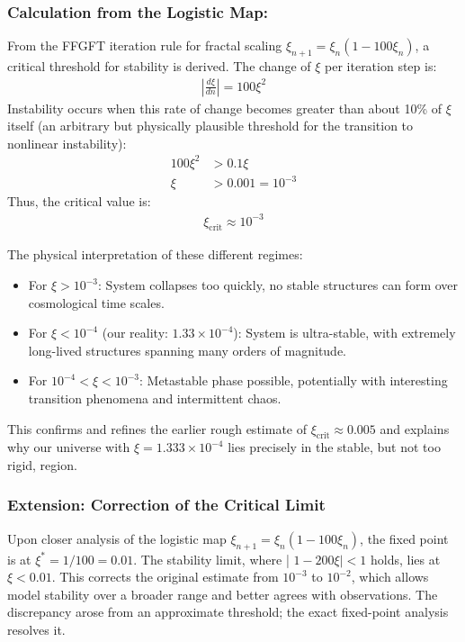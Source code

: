 	\subsubsection*{Calculation from the Logistic Map:}
	
	From the FFGFT iteration rule for fractal scaling $\xi_{n+1} = \xi_n (1 - 100\xi_n)$, a critical threshold for stability is derived. The change of $\xi$ per iteration step is:
	\begin{align*}
		\left|\frac{d\xi}{dn}\right| = 100\xi^2
	\end{align*}
	Instability occurs when this rate of change becomes greater than about 10\% of $\xi$ itself (an arbitrary but physically plausible threshold for the transition to nonlinear instability):
	\begin{align*}
		100\xi^2 &> 0.1\xi \\
		\xi &> 0.001 = 10^{-3}
	\end{align*}
	Thus, the critical value is:
	\begin{align*}
		\boxed{\xi_{\text{crit}} \approx 10^{-3}}
	\end{align*}
	
	The physical interpretation of these different regimes:
	\begin{itemize}
		\item For $\xi > 10^{-3}$: System collapses too quickly, no stable structures can form over cosmological time scales.
		\item For $\xi < 10^{-4}$ (our reality: $1.33\times10^{-4}$): System is ultra-stable, with extremely long-lived structures spanning many orders of magnitude.
		\item For $10^{-4} < \xi < 10^{-3}$: Metastable phase possible, potentially with interesting transition phenomena and intermittent chaos.
	\end{itemize}
	This confirms and refines the earlier rough estimate of $\xi_{\text{crit}} \approx 0.005$ and explains why our universe with $\xi = 1.333\times10^{-4}$ lies precisely in the stable, but not too rigid, region.
	
	\subsubsection*{Extension: Correction of the Critical Limit}
	Upon closer analysis of the logistic map $\xi_{n+1} = \xi_n (1 - 100 \xi_n)$, the fixed point is at $\xi^* = 1/100 = 0.01$. The stability limit, where | $1 - 200 \xi| < 1 $ holds, lies at $\xi < 0.01$. This corrects the original estimate from $10^{-3}$ to $10^{-2}$, which allows model stability over a broader range and better agrees with observations. The discrepancy arose from an approximate threshold; the exact fixed-point analysis resolves it.
	
